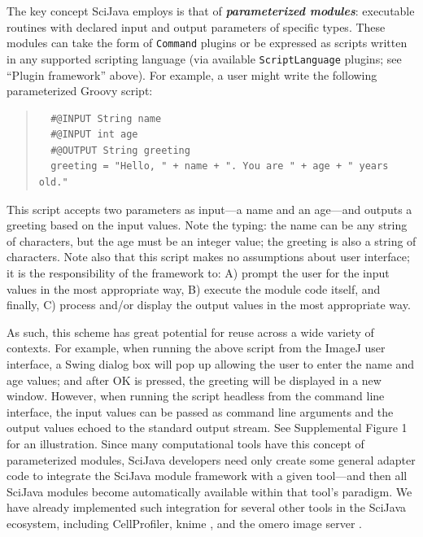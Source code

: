 \documentclass{bmcart}
\begin{document}
The key concept SciJava employs is that of \textbf{\textit{parameterized
modules}}: executable routines with declared input and output parameters of
specific types. These modules can take the form of \texttt{Command} plugins or
be expressed as scripts written in any supported scripting language (via
available \texttt{ScriptLanguage} plugins; see ``Plugin framework'' above). For
example, a user might write the following parameterized Groovy \cite{groovy}
script:

\begin{quote}
  \small
  \begin{verbatim}
  #@INPUT String name
  #@INPUT int age
  #@OUTPUT String greeting
  greeting = "Hello, " + name + ". You are " + age + " years old."\end{verbatim}
\end{quote}

This script accepts two parameters as input---a name and an age---and outputs a
greeting based on the input values. Note the typing: the name can be any string
of characters, but the age must be an integer value; the greeting is also a
string of characters. Note also that this script makes no assumptions about
user interface; it is the responsibility of the framework to: A) prompt the
user for the input values in the most appropriate way, B) execute the module
code itself, and finally, C) process and/or display the output values in the
most appropriate way.

As such, this scheme has great potential for reuse across a wide variety of
contexts. For example, when running the above script from the ImageJ user
interface, a Swing dialog box will pop up allowing the user to enter the name
and age values; and after OK is pressed, the greeting will be displayed in a
new window. However, when running the script headless from the command line
interface, the input values can be passed as command line arguments and the
output values echoed to the standard output stream. See Supplemental Figure 1
for an illustration. Since many computational tools have this concept of
parameterized modules, SciJava developers need only create some general adapter
code to integrate the SciJava module framework with a given tool---and then all
SciJava modules become automatically available within that tool's paradigm. We
have already implemented such integration for several other tools in the
SciJava ecosystem, including CellProfiler, \acrshort{knime} \cite{knip}, and
the \acrshort{omero} image server \cite{omero}.
\end{document}
